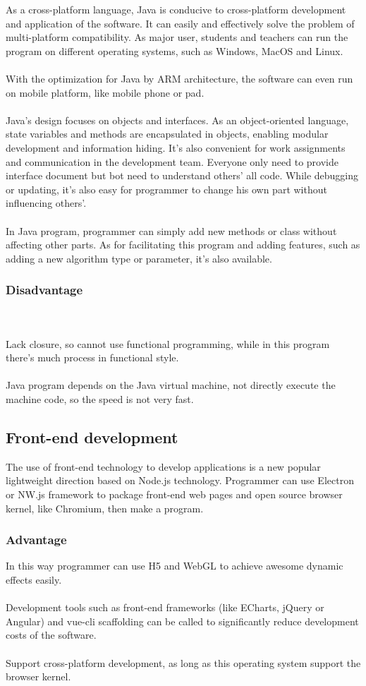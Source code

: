 \documentclass[11pt,oneside,a4paper]{article}
\begin{document}
As a cross-platform language, Java is conducive to cross-platform development and application of the software. It can easily and effectively solve the problem of multi-platform compatibility. As major user, students and teachers can run the program on different operating systems, such as Windows, MacOS and Linux.
\\\\With the optimization for Java by ARM architecture, the software can even run on mobile platform, like mobile phone or pad.
\\\\Java's design focuses on objects and interfaces. As an object-oriented language, state variables and methods are encapsulated in objects, enabling modular development and information hiding. It’s also convenient for work assignments and communication in the development team. Everyone only need to provide interface document but bot need to understand others’ all code. While debugging or updating, it’s also easy for programmer to change his own part without influencing others’.
\\\\In Java program, programmer can simply add new methods or class without affecting other parts. As for facilitating this program and adding features, such as adding a new algorithm type or parameter, it’s also available.
\subsubsection{Disadvantage}
\\\\Lack closure, so cannot use functional programming, while in this program there’s much process in functional style.
\\\\Java program depends on the Java virtual machine, not directly execute the machine code, so the speed is not very fast.

\subsection{Front-end development}
The use of front-end technology to develop applications is a new popular lightweight direction based on Node.js technology. Programmer can use Electron or NW.js framework to package front-end web pages and open source browser kernel, like Chromium, then make a program.

\subsubsection{Advantage}
In this way programmer can use H5 and WebGL to achieve awesome dynamic effects easily.
\\\\Development tools such as front-end frameworks (like ECharts, jQuery or Angular) and vue-cli scaffolding can be called to significantly reduce development costs of the software.
\\\\Support cross-platform development, as long as this operating system support the browser kernel.
\end{document}
